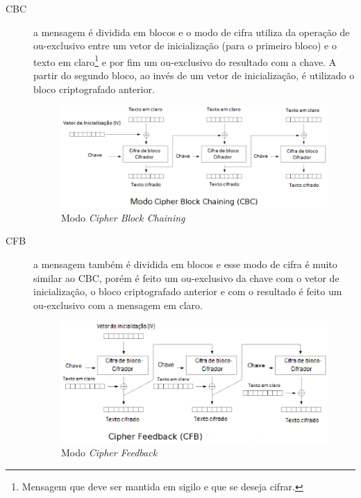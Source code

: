 \begin{description}
\begin{figure}[h]
\end{figure} 
\item[CBC] a mensagem é dividida em blocos e o modo de cifra utiliza da operação de ou-exclusivo entre um vetor de inicialização (para o primeiro bloco) e o texto em claro\footnote{Mensagem que deve ser mantida em sigilo e que se deseja cifrar.} e por fim um ou-exclusivo do resultado com a chave. A partir do segundo bloco, ao invés de um vetor de inicialização, é utilizado o bloco criptografado anterior.
\begin{figure}[h]
\centering
\includegraphics[keepaspectratio=true,scale=1.0]
    {figuras/cbc.eps}
    \caption[Modo Cipher Block Chaining]{Modo \textit{Cipher Block Chaining}\protect\footnotemark}
\end{figure} 
\item[CFB] a mensagem também é dividida em blocos e esse modo de cifra é muito similar ao CBC, porém é feito um ou-exclusivo da chave com o vetor de inicialização, o bloco criptografado anterior e com o resultado é feito um ou-exclusivo com a mensagem em claro.
\begin{figure}[h]
\centering
\includegraphics[keepaspectratio=true,scale=1.0]
    {figuras/cfb.eps}
    \caption[Modo Cipher Feedback]{Modo \textit{Cipher Feedback} \protect\footnotemark} 

\end{figure}
\end{description}
